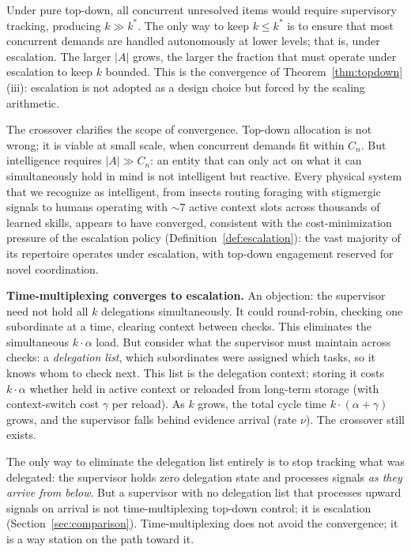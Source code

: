 \documentclass[11pt]{article}
\theoremstyle{definition}
\begin{document}
Under pure top-down, all concurrent unresolved items would require
supervisory tracking, producing $k \gg k^*$. The only way to keep
$k \leq k^*$ is to ensure that most concurrent demands are handled
autonomously at lower levels; that is, under escalation. The larger
$|A|$ grows, the larger the fraction that must operate under
escalation to keep $k$ bounded. This is the convergence of
Theorem~\ref{thm:topdown}(iii): escalation is not adopted as a
design choice but forced by the scaling arithmetic.

The crossover clarifies the scope of convergence. Top-down allocation
is not wrong; it is viable at small scale, when concurrent demands fit
within $C_n$. But intelligence requires $|A| \gg C_n$: an entity that
can only act on what it can simultaneously hold in mind is not
intelligent but reactive. Every physical system that we recognize as
intelligent, from insects routing foraging with stigmergic signals to
humans operating with ${\sim}7$ active context slots across thousands of
learned skills, appears to have converged, consistent with the
cost-minimization pressure of the escalation policy
(Definition~\ref{def:escalation}):
the vast majority of its repertoire operates under escalation, with
top-down engagement reserved for novel coordination.

\textbf{Time-multiplexing converges to escalation.}
An objection: the supervisor need not hold all $k$ delegations
simultaneously. It could round-robin, checking one subordinate at a
time, clearing context between checks. This eliminates the simultaneous
$k \cdot \alpha$ load. But consider what the supervisor must maintain
across checks: a \emph{delegation list}, which subordinates were
assigned which tasks, so it knows whom to check next. This list is the
delegation context; storing it costs $k \cdot \alpha$ whether held in
active context or reloaded from long-term storage (with context-switch
cost $\gamma$ per reload). As $k$ grows, the total cycle time $k \cdot
(\alpha + \gamma)$ grows, and the supervisor falls behind evidence
arrival (rate $\nu$). The crossover still exists.

The only way to eliminate the delegation list entirely is to stop
tracking what was delegated: the supervisor holds zero delegation state
and processes signals \emph{as they arrive from below}. But a
supervisor with no delegation list that processes upward signals on
arrival is not time-multiplexing top-down control; it is escalation
(Section~\ref{sec:comparison}). Time-multiplexing does not
avoid the convergence; it is a way station on the path toward it.
\end{document}
